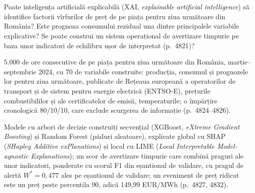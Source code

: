 \section{}
\textbf{} %
{Poate inteligența artificială explicabilă (XAI, \emph{explainable artificial intelligence}) să identifice factorii vîrfurilor de preț de pe piața pentru ziua următoare din România? Este prognoza consumului rezidual una dintre principalele variabile explicative? Se poate construi un sistem operațional de avertizare timpurie pe baza unor indicatori de echilibru ușor de interpretat (p.~4821)?}

\textbf{} %
{5.000 de ore consecutive de pe piața pentru ziua următoare din România, martie--septembrie 2024, cu 70 de variabile construite: producția, consumul și prognozele lor pentru ziua următoare, publicate de Rețeaua europeană a operatorilor de transport și de sistem pentru energie electrică (ENTSO-E), prețurile combustibililor și ale certificatelor de emisii, temperaturile; o împărțire cronologică 80/10/10, care exclude scurgerea de informație (p.~4824--4826).}

\textbf{} %
{Modele cu arbori de decizie construiți secvențial (XGBoost, \emph{eXtreme Gradient Boosting}) și Random Forest (păduri aleatoare), explicate global cu SHAP (\emph{SHapley Additive exPlanations}) și local cu LIME (\emph{Local Interpretable Model-agnostic Explanations});
un scor de avertizare timpurie care combină praguri ale unor indicatori, ponderate cu scorul F1 din eșantionul de validare, cu pragul de alertă $W^*=0{,}477$ ales pe eșantionul de validare; un eveniment de preț ridicat este un preț peste percentila 90, adică 149,99 EUR/MWh (p.~4827, 4832).}


